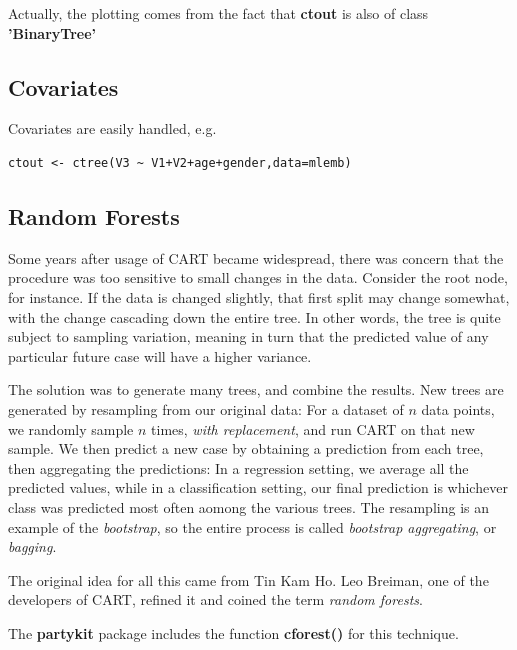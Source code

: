Actually, the plotting comes from the fact that \textbf{ctout} is also
of class \textbf{'BinaryTree'}

\subsection{Covariates}

Covariates are easily handled, e.g.

\begin{lstlisting}
ctout <- ctree(V3 ~ V1+V2+age+gender,data=mlemb)
\end{lstlisting} 

\subsection{Random Forests}

Some years after usage of CART became widespread, there was concern that
the procedure was too sensitive to small changes in the data.  Consider
the root node, for instance.  If the data is changed slightly, that
first split may change somewhat, with the change cascading down the
entire tree.  In other words, the tree is quite subject to sampling
variation, meaning in turn that the predicted value of any particular
future case will have a higher variance.

The solution was to generate many trees, and combine the results.  New
trees are generated by resampling from our original data:  For a
dataset of $n$ data points, we randomly sample $n$ times, \textit{with
replacement}, and run CART on that new sample.  We then predict a new
case by obtaining a prediction from each tree, then aggregating the
predictions:  In a regression setting, we average all the predicted
values, while in a classification setting, our final prediction is
whichever class was predicted most often aomong the various trees.
The resampling is an example of the \textit{bootstrap}, so the entire
process is called \textit{bootstrap aggregating}, or \textit{bagging}.

The original idea for all this came from Tin Kam Ho. Leo Breiman,
one of the developers of CART, refined it and coined the term
\textit{random forests}.

The \textbf{partykit} package includes the function \textbf{cforest()}
for this technique.

